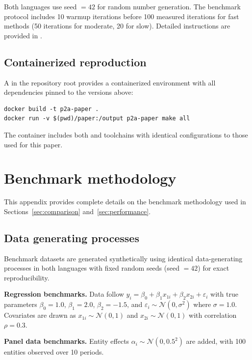 \noindent Both languages use seed $= 42$ for random number generation. The
benchmark protocol includes 10 warmup iterations before 100 measured iterations
for fast methods (50 iterations for moderate, 20 for slow). Detailed
instructions are provided in .

\subsection{Containerized reproduction}

A  in the repository root provides a containerized
environment with all dependencies pinned to the versions above:

\begin{verbatim}
docker build -t p2a-paper .
docker run -v $(pwd)/paper:/output p2a-paper make all
\end{verbatim}

\noindent The container includes both  and 
toolchains with identical configurations to those used for this paper.


\section{Benchmark methodology} \label{app:benchmark-methodology}
\setcounter{table}{0}
\setcounter{figure}{0}

This appendix provides complete details on the benchmark methodology used in
Sections~\ref{sec:comparison} and~\ref{sec:performance}.

\subsection{Data generating processes}

Benchmark datasets are generated synthetically using identical data-generating
processes in both languages with fixed random seeds (seed $= 42$) for exact
reproducibility.

\textbf{Regression benchmarks.} Data follow
$y_i = \beta_0 + \beta_1 x_{1i} + \beta_2 x_{2i} + \varepsilon_i$ with
true parameters $\beta_0 = 1.0$, $\beta_1 = 2.0$, $\beta_2 = -1.5$, and
$\varepsilon_i \sim \mathcal{N}(0, \sigma^2)$ where $\sigma = 1.0$. Covariates
are drawn as $x_{1i} \sim \mathcal{N}(0, 1)$ and $x_{2i} \sim \mathcal{N}(0, 1)$
with correlation $\rho = 0.3$.

\textbf{Panel data benchmarks.} Entity effects
$\alpha_i \sim \mathcal{N}(0, 0.5^2)$ are added, with 100 entities observed
over 10 periods.

